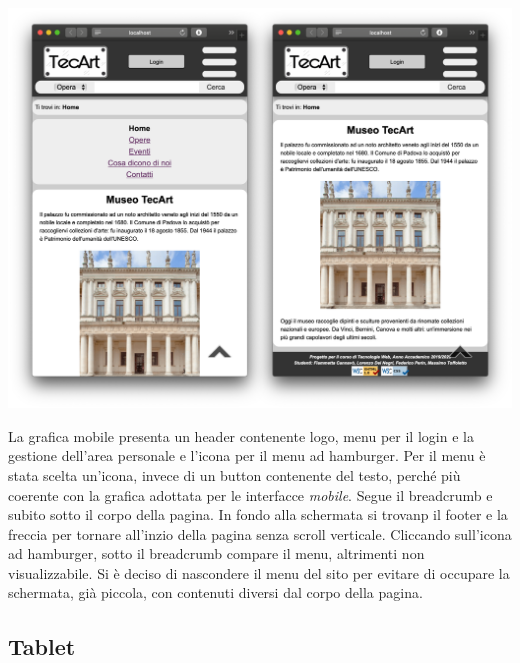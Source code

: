 \begin{center}
	\includegraphics[scale=0.27]{img/Mobile-pres}
\end{center}

La grafica mobile presenta un header contenente logo, menu per il login e la gestione dell'area personale e l'icona per il menu ad hamburger. Per il menu è stata scelta un'icona, invece di un button contenente del testo, perché più coerente con la grafica adottata per le interfacce \textit{mobile}. Segue il breadcrumb e subito sotto il corpo della pagina. In fondo alla schermata si trovanp il footer e la freccia per tornare all'inzio della pagina senza scroll verticale. Cliccando sull'icona ad hamburger, sotto il breadcrumb compare il menu, altrimenti non visualizzabile. Si è deciso di nascondere il menu del sito per evitare di occupare la schermata, già piccola, con contenuti diversi dal corpo della pagina.

\subsection{Tablet}
\label{presentazione-tablet}

